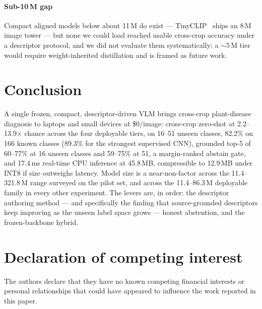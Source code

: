 \documentclass[a4paper,fleqn]{cas-dc}
\begin{document}
\paragraph{Sub-10\,M gap} Compact aligned models below about 11\,M do exist --- TinyCLIP~\citep{wu2023} ships an
8\,M image tower --- but none we could load reached usable cross-crop accuracy under a
descriptor protocol, and we did not evaluate them systematically; a
$\sim$5\,M tier would require weight-inherited distillation and is framed as future work.

\section{Conclusion}

A single frozen, compact, descriptor-driven VLM brings cross-crop plant-disease diagnosis to laptops
and small devices at \$0/image: cross-crop zero-shot at 2.2--13.9$\times$ chance across the
four deployable tiers, on 16--51 unseen
classes, 82.2\% on 166 known classes (89.3\% for the strongest supervised CNN), grounded top-5 of 60--77\% at 16 unseen classes and 59--75\% at 51, a
margin-ranked abstain gate,
and 17.4\,ms real-time CPU inference at 45.8\,MB, compressible to 12.9\,MB under INT8 if size
outweighs latency. Model size is a near-non-factor across the
11.4--321.8\,M range surveyed on the pilot set, and across the 11.4--86.3\,M deployable family in
every other experiment. The levers are, in order: the descriptor authoring method --- and
specifically the finding that source-grounded descriptors keep improving as the unseen label space
grows --- honest abstention, and the frozen-backbone hybrid.



\printcredits

\section*{Declaration of competing interest}
The authors declare that they have no known competing financial interests or personal relationships
that could have appeared to influence the work reported in this paper.
\end{document}
